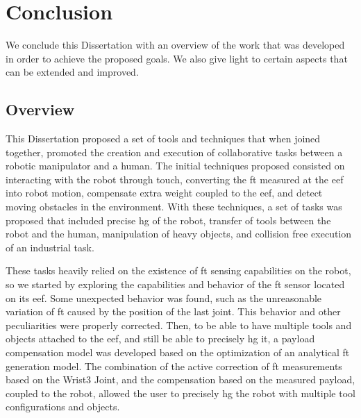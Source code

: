 \chapter{Conclusion}
\label{chp:7-conclusion}

\par We conclude this Dissertation with an overview of the work that was developed in order to achieve the proposed goals. We also give light to certain aspects that can be extended and improved.





\section{Overview}

\par This Dissertation proposed a set of tools and techniques that when joined together, promoted the creation and execution of collaborative tasks between a robotic manipulator and a human. The initial techniques proposed consisted on interacting with the robot through touch, converting the \ac{ft} measured at the \ac{eef} into robot motion, compensate extra weight coupled to the \ac{eef}, and detect moving obstacles in the environment. With these techniques, a set of tasks was proposed that included precise \ac{hg} of the robot, transfer of tools between the robot and the human, manipulation of heavy objects, and collision free execution of an industrial task.

\par These tasks  heavily relied on the existence of \ac{ft} sensing capabilities on the robot, so we started by exploring the capabilities and behavior of the \ac{ft} sensor located on its \ac{eef}. Some unexpected behavior was found, such as the unreasonable variation of \ac{ft} caused by the position of the last joint. This behavior and other peculiarities were properly corrected. Then, to be able to have multiple tools and objects attached to the \ac{eef}, and still be able to precisely \ac{hg} it, a payload compensation model was developed based on the optimization of an analytical \ac{ft} generation model. The combination of the active correction of \ac{ft} measurements based on the Wrist3 Joint, and the compensation based on the measured payload, coupled to the robot, allowed the user to precisely \ac{hg} the robot with multiple tool configurations and objects.

